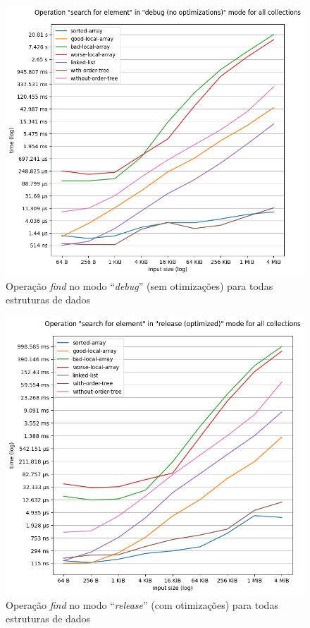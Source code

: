\documentclass[a4paper]{article}
\begin{document}
\begin{figure}
    \begin{center}
        \includegraphics[width=15cm, keepaspectratio]
        {../charts/collections-find-debug.png}
    \end{center}
    \caption{Operação \textit{find} no modo ``\textit{debug}''
        (sem otimizações) para todas estruturas de dados}
    \label{fig:collection find debug}
\end{figure}

\begin{figure}
    \begin{center}
        \includegraphics[width=15cm, keepaspectratio]
        {../charts/collections-find-release.png}
    \end{center}
    \caption{Operação \textit{find} no modo ``\textit{release}''
        (com otimizações) para todas estruturas de dados}
    \label{fig:collection find release}
\end{figure}
\end{document}
